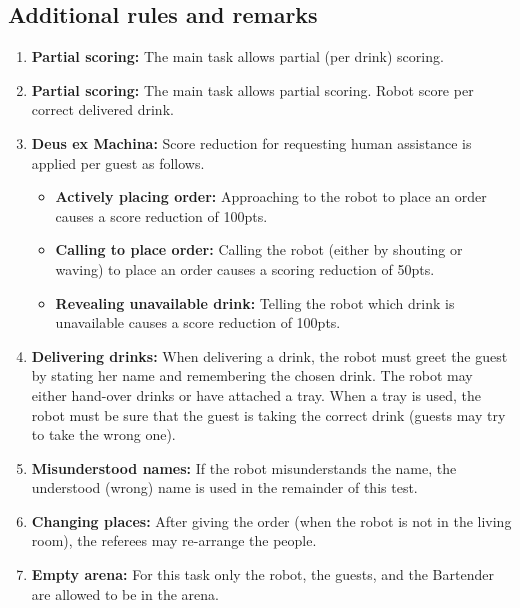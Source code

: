 \subsection*{Additional rules and remarks}
\begin{enumerate}
	\item \textbf{Partial scoring:} The main task allows partial (per drink) scoring.
	
	\item \textbf{Partial scoring:} The main task allows partial scoring.
	Robot score per correct delivered drink.

	\item \textbf{Deus ex Machina:} Score reduction for requesting human assistance is applied per guest as follows.
	\begin{itemize}[nosep]
		\item \textbf{Actively placing order:} Approaching to the robot to place an order causes a score reduction of 100pts.

		\item \textbf{Calling to place order:} Calling the robot (either by shouting or waving) to place an order causes a scoring reduction of 50pts.

		\item \textbf{Revealing unavailable drink:} Telling the robot which drink is unavailable causes a score reduction of 100pts.
	\end{itemize}

	\item \textbf{Delivering drinks:} When delivering a drink, the robot must greet the guest by stating her name and remembering the chosen drink.
	The robot may either hand-over drinks or have attached a tray.
	When a tray is used, the robot must be sure that the guest is taking the correct drink (guests may try to take the wrong one).

	\item \textbf{Misunderstood names:} If the robot misunderstands the name, the understood (wrong) name is used in the remainder of this test.

	\item \textbf{Changing places:} After giving the order (when the robot is not in the living room), the referees may re-arrange the people.

	\item \textbf{Empty arena:} For this task only the robot, the guests, and the Bartender are allowed to be in the arena.
\end{enumerate}

